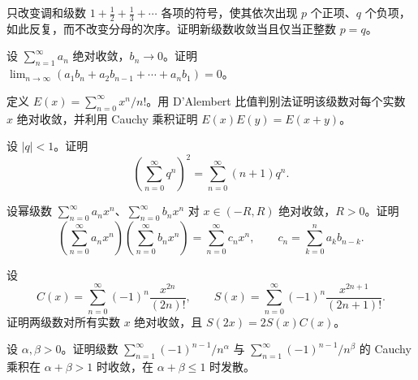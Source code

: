 \noindent\begin{minipage}{\textwidth}
只改变调和级数 $1+\frac12+\frac13+\cdots$ 各项的符号，使其依次出现 $p$ 个正项、$q$ 个负项，如此反复，而不改变分母的次序。证明新级数收敛当且仅当正整数 $p=q$。
\end{minipage}\par\vfill
\noindent\begin{minipage}{\textwidth}
设 $\sum_{n=1}^{\infty}a_n$ 绝对收敛，$b_n\to0$。证明 $\lim_{n\to\infty}(a_1b_n+a_2b_{n-1}+\cdots+a_nb_1)=0$。
\end{minipage}\par\vfill
\newpage
\noindent\begin{minipage}{\textwidth}
定义 $E(x)=\sum_{n=0}^{\infty}x^n/n!$。用 D’Alembert 比值判别法证明该级数对每个实数 $x$ 绝对收敛，并利用 Cauchy 乘积证明 $E(x)E(y)=E(x+y)$。
\end{minipage}\par\vfill
\noindent\begin{minipage}{\textwidth}
设 $|q|<1$。证明\[\left(\sum_{n=0}^{\infty}q^n\right)^2=\sum_{n=0}^{\infty}(n+1)q^n.\]
\end{minipage}\par\vfill
\noindent\begin{minipage}{\textwidth}
设幂级数 $\sum_{n=0}^{\infty}a_nx^n$、$\sum_{n=0}^{\infty}b_nx^n$ 对 $x\in(-R,R)$ 绝对收敛，$R>0$。证明\[\left(\sum_{n=0}^{\infty}a_nx^n\right)\left(\sum_{n=0}^{\infty}b_nx^n\right)=\sum_{n=0}^{\infty}c_nx^n,\qquad c_n=\sum_{k=0}^na_kb_{n-k}.\]
\end{minipage}\par\vfill
\newpage
\noindent\begin{minipage}{\textwidth}
设\[C(x)=\sum_{n=0}^{\infty}(-1)^n\frac{x^{2n}}{(2n)!},\qquad S(x)=\sum_{n=0}^{\infty}(-1)^n\frac{x^{2n+1}}{(2n+1)!}.\]证明两级数对所有实数 $x$ 绝对收敛，且 $S(2x)=2S(x)C(x)$。
\end{minipage}\par\vfill
\noindent\begin{minipage}{\textwidth}
设 $\alpha,\beta>0$。证明级数 $\sum_{n=1}^{\infty}(-1)^{n-1}/n^\alpha$ 与 $\sum_{n=1}^{\infty}(-1)^{n-1}/n^\beta$ 的 Cauchy 乘积在 $\alpha+\beta>1$ 时收敛，在 $\alpha+\beta\le1$ 时发散。
\end{minipage}\par\vfill
